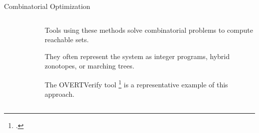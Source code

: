 \begin{frame}[fragile]{Combinatorial Optimization}
\begin{columns}
\begin{column}{0.4\textwidth}
\begin{figure}
{\begin{tikzpicture}
                    \end{tikzpicture}
                }
            \end{figure}
        \end{column}
        \begin{column}{0.6\textwidth}
            Tools using these methods solve combinatorial problems to compute reachable sets.
            
            \vspace{0.5cm}

            They often represent the system as integer programs, hybrid zonotopes, or marching trees.

            \vspace{0.5cm}

            The OVERTVerify tool \footcite{sidrane2022overt} is a representative example of this approach.
        \end{column}
    \end{columns}
\end{frame}

